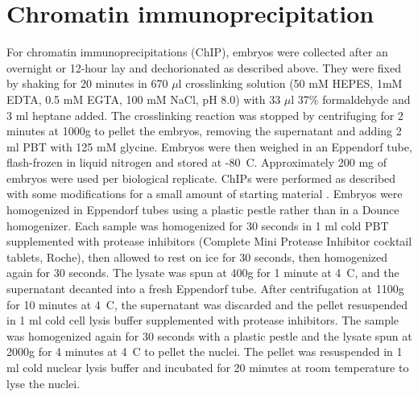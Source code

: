 \section{Chromatin immunoprecipitation}
For chromatin immunoprecipitations (ChIP), embryos were collected after an overnight or 12-hour lay and dechorionated as described above. They were fixed by shaking for 20 minutes in 670 \(\mu\)l crosslinking solution (50 mM HEPES, 1mM EDTA, 0.5 mM EGTA, 100 mM NaCl, pH 8.0) with 33 \(\mu\)l 37\% formaldehyde and 3 ml heptane added. The crosslinking reaction was stopped by centrifuging for 2 minutes at 1000g to pellet the embryos, removing the supernatant and adding 2 ml PBT with 125 mM glycine. Embryos were then weighed in an Eppendorf tube, flash-frozen in liquid nitrogen and stored at -80\degree~C. Approximately 200 mg of embryos were used per biological replicate. ChIPs were performed as described with some modifications for a small amount of starting material \citep{ghavi-helm_analyzing_2012, sandmann_chip--chip_2007}. Embryos were homogenized in Eppendorf tubes using a plastic pestle rather than in a Dounce homogenizer. Each sample was homogenized for 30 seconds in 1 ml cold PBT supplemented with protease inhibitors (Complete Mini Protease Inhibitor cocktail tablets, Roche), then allowed to rest on ice for 30 seconds, then homogenized again for 30 seconds. The lysate was spun at 400g for 1 minute at 4\degree~C, and the supernatant decanted into a fresh Eppendorf tube. After centrifugation at 1100g for 10 minutes at 4\degree~C, the supernatant was discarded and the pellet resuspended in 1 ml cold cell lysis buffer supplemented with protease inhibitors. The sample was homogenized again for 30 seconds with a plastic pestle and the lysate spun at 2000g for 4 minutes at 4\degree~C to pellet the nuclei. The pellet was resuspended in 1 ml cold nuclear lysis buffer and incubated for 20 minutes at room temperature to lyse the nuclei.\\ 

